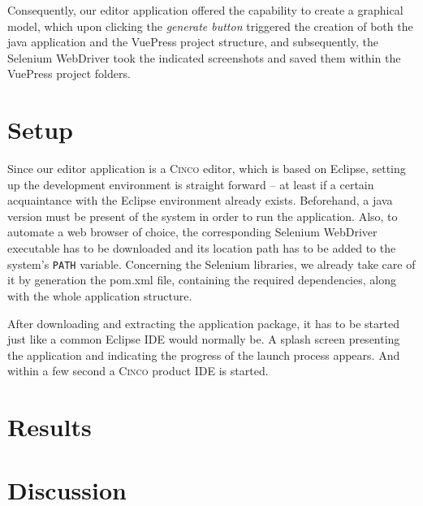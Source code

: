 Consequently, our editor application offered the capability to create a graphical model, which upon clicking the \textit{generate button} triggered the creation of both the java application and the VuePress project structure, and subsequently, the Selenium WebDriver took the indicated screenshots and saved them within the VuePress project folders.

\section{Setup}\label{sec:setup}

Since our editor application is a \textsc{Cinco} editor, which is based on Eclipse, setting up the development environment is straight forward -- at least if a certain acquaintance with the Eclipse environment already exists. Beforehand, a java version must be present of the system in order to run the application. Also, to automate a web browser of choice, the corresponding Selenium WebDriver executable has to be downloaded and its location path has to be added to the system's \lstinline{PATH} variable. Concerning the Selenium libraries, we already take care of it by generation the pom.xml file, containing the required dependencies, along with the whole application structure.

After downloading and extracting the application package, it has to be started just like a common Eclipse IDE would normally be. A splash screen presenting the application and indicating the progress of the launch process appears. And within a few second a \textsc{Cinco} product IDE is started. 

\section{Results}\label{sec:res}

\section{Discussion}\label{sec:disc}

